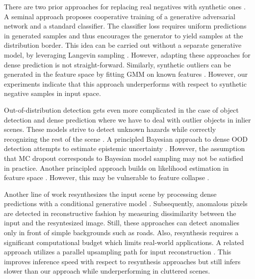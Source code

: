 \documentclass[lettersize,journal,hidelinks]{IEEEtran}
\begin{document}
There are two prior approaches
for replacing real negatives with synthetic ones \cite{lee18iclr,zhao23tpami}.
A seminal approach \cite{lee18iclr} proposes cooperative training
of a generative adversarial network and a standard classifier.
The classifier loss requires 
uniform predictions in generated samples
and thus encourages the generator
to yield samples at the distribution border.
This idea can be carried out without a separate generative model, by leveraging Langevin sampling \cite{zhao23tpami}.
However, adapting these approaches for dense prediction
is not straight-forward.
Similarly, synthetic outliers can be generated in the feature space by fitting GMM on known features \cite{du22iclr}.
However, our experiments indicate that this approach underperforms with respect to synthetic negative samples in input space.

Out-of-distribution detection gets even more complicated in the case of object detection and dense prediction where we have to deal with outlier objects in inlier scenes.
These models strive to detect unknown hazards while correctly recognizing the rest of the scene \cite{blum19iccvw,du22cvpr,riedlinger23wacv}.
A principled Bayesian approach to dense OOD detection attempts to estimate epistemic uncertainty \cite{kendall17nips}.
However, the assumption that MC dropout corresponds to Bayesian model sampling may not be satisfied in practice.
Another principled approach builds on 
likelihood estimation in feature space \cite{blum21ijcv}.
However, this may be vulnerable to feature collapse \cite{amersfoort21arxiv}.

Another line of work resynthesizes the input scene 
by processing dense predictions 
with a conditional generative model \cite{biase21cvpr,lis19iccv,xia20eccv}. 
Subsequently, anomalous pixels are detected
in reconstructive fashion \cite{ruff21pieee} 
by measuring dissimilarity between the input 
and the resyntesized image. 
Still, these approaches can detect anomalies only
in front of  simple backgrounds such as roads.
Also, resynthesis requires a significant computational budget which limits real-world applications.
A related approach utilizes a parallel upsampling path for input reconstruction \cite{vojir21iccv}.
This improves inference speed with respect to resynthesis approaches but still infers slower than our approach
while underperforming in cluttered scenes.
\end{document}
